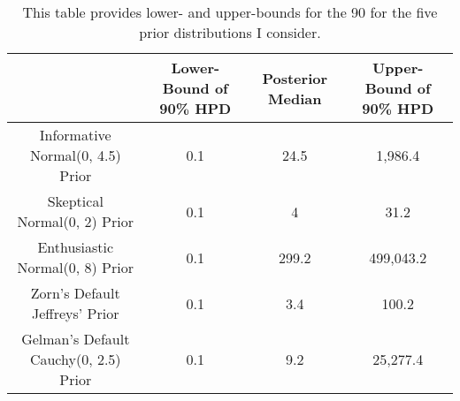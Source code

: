 \begin{table}[H]
\centering
{\scriptsize
\begin{tabular}{|cccc|}
  \hline
 & Lower-Bound of 90\% HPD & Posterior Median & Upper-Bound of 90\% HPD \\ 
  \hline
Informative Normal(0, 4.5) Prior &       0.1 &      24.5 &   1,986.4 \\ 
  Skeptical Normal(0, 2) Prior &       0.1 &         4 &      31.2 \\ 
  Enthusiastic Normal(0, 8) Prior &       0.1 &     299.2 & 499,043.2 \\ 
  Zorn's Default Jeffreys' Prior &       0.1 &       3.4 &     100.2 \\ 
  Gelman's Default Cauchy(0, 2.5) Prior &       0.1 &       9.2 &  25,277.4 \\ 
   \hline
\end{tabular}
}
\caption{This table provides lower- and upper-bounds for the 90%
              for the five prior distributions I consider.} 
\label{tab:bm-pppd-deciles}
\end{table}
